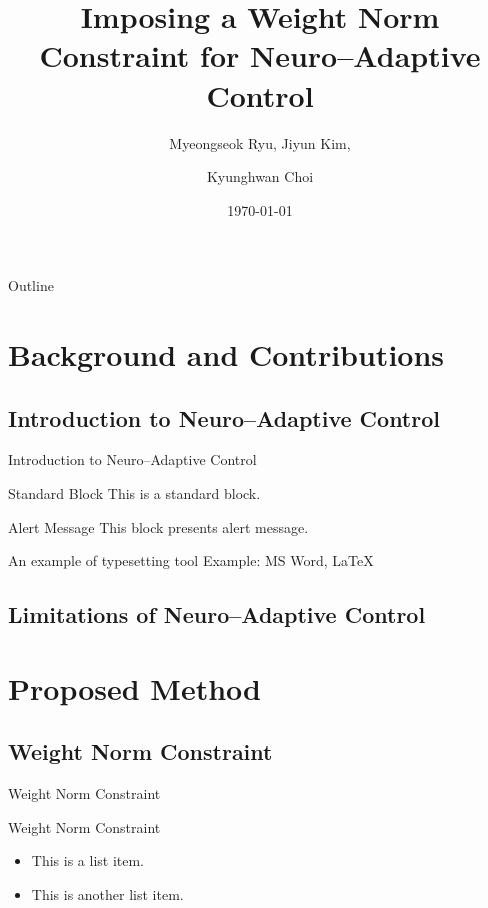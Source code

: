 \documentclass{beamer}
\title{
    Imposing a Weight Norm Constraint for Neuro–Adaptive Control 
}
\author{Myeongseok Ryu\inst{1}, Jiyun Kim\inst{2}, \and Kyunghwan Choi\inst{1}}
\date{\today}
\institute %
{
  \inst{1}%
  Department of Mechanical and Robotics Engineering\\
  Gwangju Institute of Science and Technology 
  \and
  \inst{2}%
  AI Graduate School\\
  Gwangju Institute of Science and Technology 
}
\begin{document}
\begin{frame}
    \titlepage 
\end{frame}

\begin{frame}{Outline}
    \tableofcontents
\end{frame}

\section{Background and Contributions}

\subsection{Introduction to Neuro–Adaptive Control}

\begin{frame}{Introduction to Neuro–Adaptive Control}

    \begin{block}{Standard Block}
        This is a standard block.
    \end{block}
    \begin{alertblock}{Alert Message}
        This block presents alert message.
    \end{alertblock}
    \begin{exampleblock}{An example of typesetting tool}
        Example: MS Word, \LaTeX{}
    \end{exampleblock}

\end{frame} 

\subsection{Limitations of Neuro–Adaptive Control}

\begin{frame}

\end{frame}

\section{Proposed Method}
\subsection{Weight Norm Constraint}
\begin{frame}{Weight Norm Constraint}
    \begin{block}{Weight Norm Constraint}
        \begin{itemize}
            \item This is a list item.
            \item This is another list item.
        \end{itemize}
    \end{block}
\end{frame}
\end{document}
